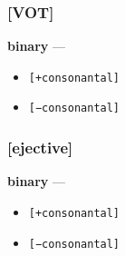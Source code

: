 \documentclass[10pt,letterpaper]{article}
\begin{document}
\subsubsection{[VOT]}
\label{ssub:feature_vot}
\textbf{binary} — 

\begin{itemize}
\item \texttt{[+consonantal]}
\item \texttt{[−consonantal]}
\end{itemize}

\subsubsection{[ejective]}
\label{ssub:feature_ejective}
\textbf{binary} — 

\begin{itemize}
\item \texttt{[+consonantal]}
\item \texttt{[−consonantal]}
\end{itemize}
\end{document}
